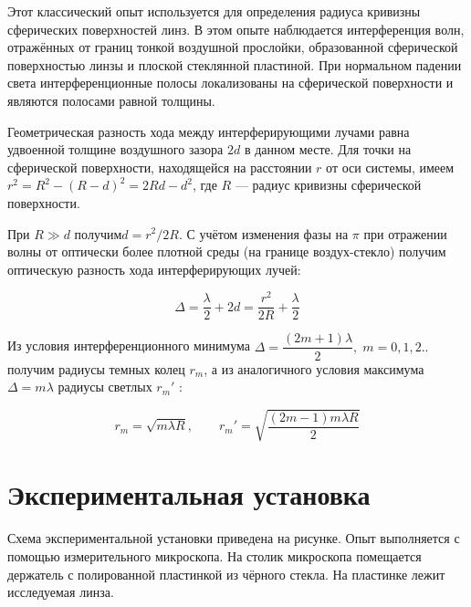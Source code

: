 \documentclass[a4paper,12pt]{article} %
\begin{document}
\noindent Этот классический опыт используется для определения радиуса кривизны сферических поверхностей линз. В этом опыте наблюдается интерференция волн, отражённых от границ тонкой воздушной прослойки, образованной сферической поверхностью линзы и плоской стеклянной пластиной. При нормальном падении света интерференционные полосы локализованы на сферической поверхности и являются полосами равной толщины.

\medskip
	
\noindent Геометрическая разность хода между интерферирующими лучами равна удвоенной толщине воздушного зазора $ 2d $ в данном месте. Для точки на сферической поверхности, находящейся на расстоянии $ r $ от оси системы, имеем $ r^2 = R^2 - (R - d)^2 = 2Rd - d^2 $, где $ R $ --- радиус кривизны сферической поверхности.

\medskip
	
\noindent При $ R \gg d $ получим$  d = r^2/2R $. С учётом изменения фазы на $ \pi $ при отражении волны от оптически более плотной среды (на границе воздух-стекло) получим оптическую разность хода интерферирующих лучей:
	
	\begin{equation}\label{r_m}
	\Delta = \dfrac{\lambda}{2} + 2d = \dfrac{r^2}{2R} + \dfrac{\lambda}{2}
	\end{equation}
	
\noindent Из условия интерференционного минимума $ \Delta = \dfrac{(2m +1)\lambda}{2}, \; m =0, 1, 2.. $ получим радиусы темных колец $ r_m $, а из аналогичного условия максимума $ \Delta = m \lambda $ радиусы светлых $ r_m' $ :
	
	\begin{equation}\label{r_m'}
	r_m = \sqrt{m \lambda R}, \qquad 	r_m' = \sqrt{\dfrac{(2m-1)m \lambda R}{2}}
	\end{equation}
	
	\section{Экспериментальная установка}

\noindent Схема экспериментальной установки приведена на рисунке. Опыт выполняется с помощью измерительного микроскопа.
На столик микроскопа помещается держатель с полированной пластинкой из
чёрного стекла. На пластинке лежит исследуемая линза.
\end{document}
